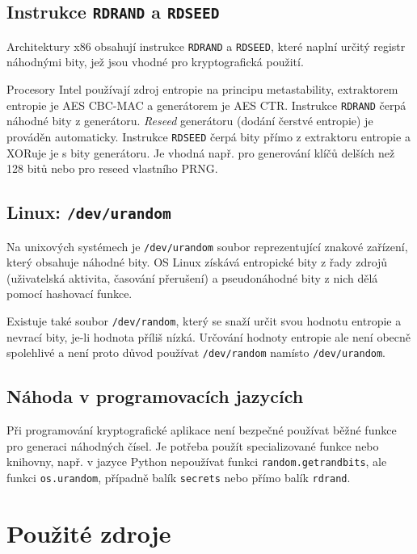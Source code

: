 \documentclass[a4paper,12pt]{article}
\begin{document}
	\subsection{Instrukce \texttt{RDRAND} a \texttt{RDSEED}}
	
	Architektury x86 obsahují instrukce \texttt{RDRAND} a \texttt{RDSEED}, které naplní určitý registr náhodnými bity, jež jsou vhodné pro kryptografická použití.
	
	Procesory Intel používají zdroj entropie na principu metastability, extraktorem entropie je AES CBC-MAC a generátorem je AES CTR. Instrukce \texttt{RDRAND} čerpá náhodné bity z generátoru. \textit{Reseed} generátoru (dodání čerstvé entropie) je prováděn automaticky. Instrukce \texttt{RDSEED} čerpá bity přímo z extraktoru entropie a XORuje je s bity generátoru. Je vhodná např. pro generování klíčů delších než 128 bitů nebo pro reseed vlastního PRNG.
	
	\subsection{Linux: \texttt{/dev/urandom}}
	
	Na unixových systémech je \texttt{/dev/urandom} soubor reprezentující znakové zařízení, který obsahuje náhodné bity. OS Linux získává entropické bity z řady zdrojů (uživatelská aktivita, časování přerušení) a pseudonáhodné bity z nich dělá pomocí hashovací funkce.
	
	Existuje také soubor \texttt{/dev/random}, který se snaží určit svou hodnotu entropie a nevrací bity, je-li hodnota příliš nízká. Určování hodnoty entropie ale není obecně spolehlivé a není proto důvod používat \texttt{/dev/random} namísto \texttt{/dev/urandom}.
	
	\subsection{Náhoda v programovacích jazycích}
	
	Při programování kryptografické aplikace není bezpečné používat běžné funkce pro generaci náhodných čísel. Je potřeba použít specializované funkce nebo knihovny, např. v jazyce Python nepoužívat funkci \texttt{random.getrandbits}, ale funkci \texttt{os.urandom}, případně balík \texttt{secrets} nebo přímo balík \texttt{rdrand}.
		
	\null\vfill\section*{Použité zdroje}\printbibliography[heading=none]
	
\end{document}
